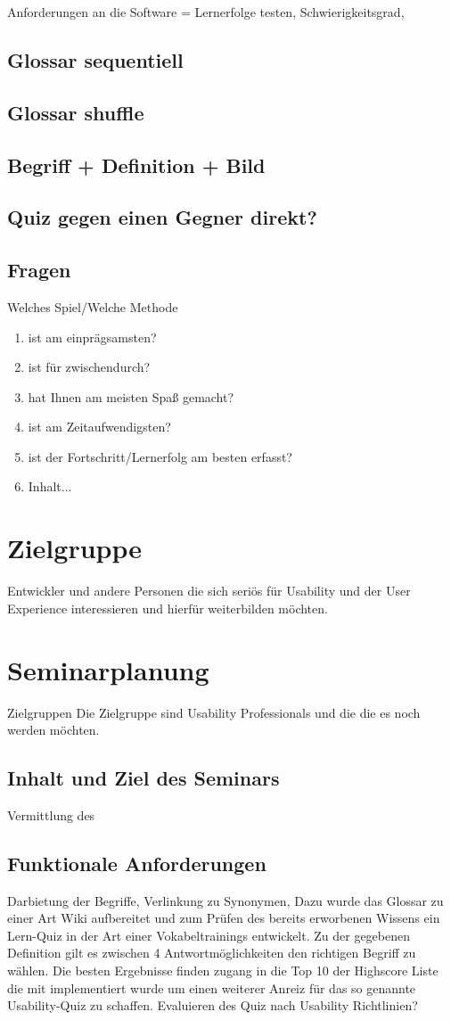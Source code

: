 \documentclass[a4paper, 12pt, twoside, BCOR=20mm, DIV=calc, abstracton, parskip=half*, toc=bibliography, toc=listof, headsepline, footsepline, headings=small, numbers=enddot]{scrreprt}
\begin{document}
	Anforderungen an die Software = Lernerfolge testen, Schwierigkeitsgrad, 
	
	\subsection{Glossar sequentiell}
	\subsection{Glossar shuffle}
	\subsection{Begriff + Definition + Bild}
	\subsection{Quiz gegen einen Gegner direkt?}
	\subsection{Fragen}
	Welches Spiel/Welche Methode
	\begin{enumerate}
		\item  ist am einprägsamsten?
		\item  ist für zwischendurch?
		\item  hat Ihnen am meisten Spaß gemacht?
		\item  ist am Zeitaufwendigsten?
		\item  ist der Fortschritt/Lernerfolg am besten erfasst?
		\item Inhalt...
		\end{enumerate}
		
\section{Zielgruppe}
Entwickler und andere Personen die sich seriös für Usability und der User Experience interessieren und hierfür weiterbilden möchten. 

\section{Seminarplanung}
Zielgruppen
Die Zielgruppe sind Usability Professionals und die die es noch werden möchten. 
\subsection{Inhalt und Ziel des Seminars}
Vermittlung des
\subsection{Funktionale Anforderungen}
Darbietung der Begriffe, Verlinkung zu Synonymen, 
Dazu wurde das Glossar zu einer Art Wiki aufbereitet und zum Prüfen des bereits erworbenen Wissens ein Lern-Quiz in der Art einer Vokabeltrainings entwickelt. Zu der gegebenen Definition gilt es zwischen 4 Antwortmöglichkeiten den richtigen Begriff zu wählen. Die besten Ergebnisse finden zugang in die Top 10 der Highscore Liste die mit implementiert wurde um einen weiterer Anreiz für das so genannte Usability-Quiz zu schaffen. 
Evaluieren des Quiz nach Usability Richtlinien?
\end{document}
